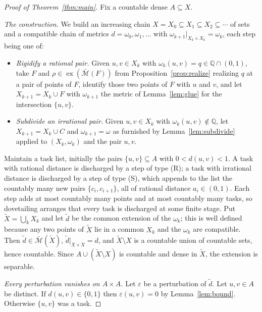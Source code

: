 \documentclass[11pt]{article}
\theoremstyle{definition}
\theoremstyle{remark}
\newcommand{\Q}{\mathbb{Q}}
\newcommand{\bM}{\bar{\mathcal{M}}}
\newcommand{\ex}{\operatorname{ex}}
\newcommand{\eps}{\varepsilon}
\begin{document}
\begin{proof}[Proof of Theorem~\ref{thm:main}]
Fix a countable dense $A\subseteq X$.

\smallskip
\noindent\emph{The construction.}
We build an increasing chain $X=X_0\subseteq X_1\subseteq X_2\subseteq\cdots$ of sets and a
compatible chain of metrics $d=\omega_0,\omega_1,\ldots$ with
$\omega_{k+1}|_{X_k\times X_k}=\omega_k$, each step being one of:

\begin{itemize}
\item[(R)] \emph{Rigidify a rational pair.} Given $u,v\in X_k$ with
$\omega_k(u,v)=q\in\Q\cap(0,1)$, take $F$ and $\rho\in\ex(\bM(F))$ from
Proposition~\ref{prop:realize} realizing $q$ at a pair of points of $F$, identify those two
points of $F$ with $u$ and $v$, and let $X_{k+1}=X_k\cup F$ with $\omega_{k+1}$ the metric
of Lemma~\ref{lem:glue} for the intersection $\{u,v\}$.

\item[(S)] \emph{Subdivide an irrational pair.} Given $u,v\in X_k$ with
$\omega_k(u,v)\notin\Q$, let $X_{k+1}=X_k\cup C$ and $\omega_{k+1}=\omega$ as furnished by
Lemma~\ref{lem:subdivide} applied to $(X_k,\omega_k)$ and the pair $u,v$.
\end{itemize}

Maintain a task list, initially the pairs $\{u,v\}\subseteq A$ with $0<d(u,v)<1$. A task
with rational distance is discharged by a step of type (R); a task with irrational distance
is discharged by a step of type (S), which appends to the list the countably many new pairs
$\{c_i,c_{i+1}\}$, all of rational distance $a_i\in(0,1)$. Each step adds at most countably
many points and at most countably many tasks, so dovetailing arranges that every task is
discharged at some finite stage. Put $\tilde X=\bigcup_k X_k$ and let $\tilde d$ be the
common extension of the $\omega_k$; this is well defined because any two points of
$\tilde X$ lie in a common $X_k$ and the $\omega_k$ are compatible. Then
$\tilde d\in\bM(\tilde X)$, $\tilde d|_{X\times X}=d$, and $\tilde X\setminus X$ is a
countable union of countable sets, hence countable. Since $A\cup(\tilde X\setminus X)$ is
countable and dense in $\tilde X$, the extension is separable.

\smallskip
\noindent\emph{Every perturbation vanishes on $A\times A$.}
Let $\eps$ be a perturbation of $\tilde d$. Let $u,v\in A$ be distinct. If $d(u,v)\in\{0,1\}$
then $\eps(u,v)=0$ by Lemma~\ref{lem:bound}. Otherwise $\{u,v\}$ was a task.


\end{proof}
\end{document}
